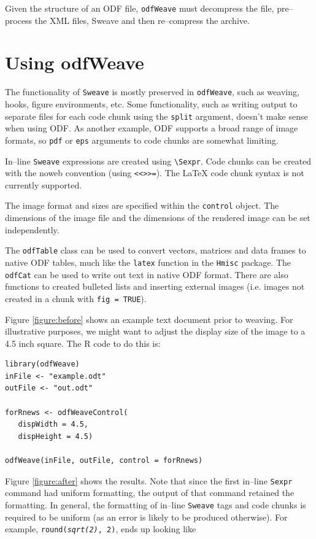 \documentclass[12pt]{article}
\begin{document}
Given the structure of an ODF file, \texttt{odfWeave} must decompress the file, pre--process the XML files, Sweave and then re--compress the archive. 


\section{Using odfWeave}

The functionality of \texttt{Sweave} is mostly preserved in \texttt{odfWeave}, such as weaving, hooks, figure environments, etc. Some functionality, such as writing output to separate files for each code chunk using the \texttt{split} argument, doesn't make sense when using ODF. As another example, ODF supports a broad range of image formats, so \texttt{pdf} or \texttt{eps} arguments to code chunks are somewhat limiting.

In--line \texttt{Sweave} expressions are created using \verb|\Sexpr|. Code chunks can be created with the noweb convention (using \verb|<<>>=|). The \LaTeX{} code chunk syntax is not currently supported.

The image format and sizes are specified within the \texttt{control} object. The dimensions of the image file and the dimensions of the rendered image can be set independently.

The \texttt{odfTable} class can be used to convert vectors, matrices and data frames to native ODF tables, much like the \texttt{latex} function in the \texttt{Hmisc} package. The \texttt{odfCat} can be used to write out text in native ODF format. There are also functions to created bulleted lists and inserting external images (i.e. images not created in a chunk with \texttt{fig = TRUE}). 

Figure \ref{figure:before} shows an example text document prior to weaving. For illustrative purposes, we might want to adjust the display size of the image to a 4.5 inch square. The R code to do this is:
\begin{verbatim}
library(odfWeave)
inFile <- "example.odt"
outFile <- "out.odt"

forRnews <- odfWeaveControl(
   dispWidth = 4.5, 
   dispHeight = 4.5)

odfWeave(inFile, outFile, control = forRnews)
\end{verbatim}
Figure \ref{figure:after} shows the results. Note that since the first in--line \texttt{Sexpr} command had uniform formatting, the output of that command retained the formatting. In general, the formatting of in--line \texttt{Sweave} tags and code chunks is required to be uniform (as an error is likely to be produced otherwise). For example,  \texttt{round({\it sqrt(2)}, 2)}, ends up looking like
      
\end{document}
